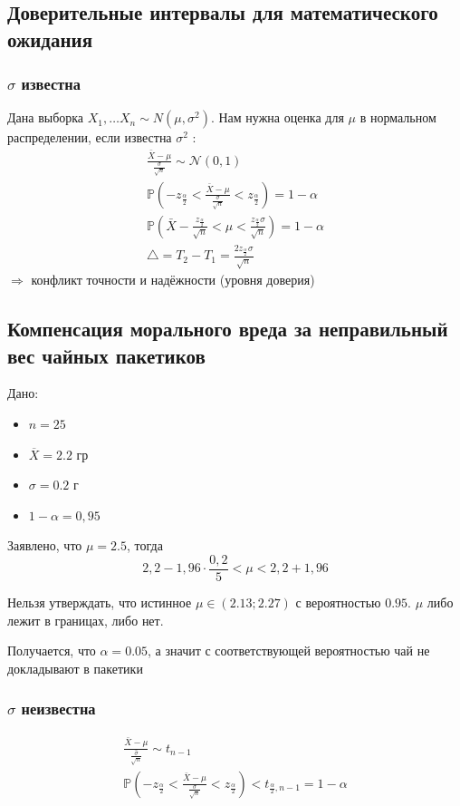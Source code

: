 \documentclass[a4paper, 10pt]{article}
\begin{document}
\subsection{Доверительные интервалы для математического ожидания}
\subsubsection{$\sigma$ известна}
Дана выборка $X_{1}, \ldots X_{n} \sim N\left(\mu, \sigma^{2}\right)$. Нам нужна оценка для $\mu$ в нормальном распределении, если известна $\sigma^{2}$ :
$$
\begin{gathered}
\frac{\bar{X}-\mu}{\frac{\sigma}{\sqrt{n}}} \sim \mathcal{N}(0,1) \\
\mathbb{P}\left(-z_{\frac{\alpha}{2}}<\frac{\bar{X}-\mu}{\frac{\sigma}{\sqrt{n}}}<z_{\frac{\alpha}{2}}\right)=1-\alpha \\
\mathbb{P}\left(\bar{X}-\frac{z_{\frac{\alpha}{2}}}{\sqrt{n}}<\mu<\frac{z_{\frac{\alpha}{2}} \sigma}{\sqrt{n}}\right)=1-\alpha \\
\triangle=T_{2}-T_{1}=\frac{2 z_{\frac{\alpha}{2}} \sigma}{\sqrt{n}}
\end{gathered}
$$
$\Longrightarrow$ конфликт точности и надёжности (уровня доверия)

\subsection{Компенсация морального вреда за неправильный вес чайных пакетиков}
Дано:
\begin{itemize}
    \item $n=25$
    \item $\overline{X}=2.2$ гр
    \item $\sigma=0.2$ г
    \item $1-\alpha=0,95$
\end{itemize}

Заявлено, что $\mu=2.5$, тогда
\begin{equation*}
    2,2-1,96 \cdot \frac{0,2}{5}<\mu<2,2+1,96
\end{equation*}

\comment Нельзя утверждать, что истинное $\mu\in(2.13;2.27)$ с вероятностью $0.95$. $\mu$ либо лежит в границах, либо нет.

Получается, что $\alpha=0.05$, а значит с соответствующей вероятностью чай не докладывают в пакетики

\subsubsection{$\sigma$ неизвестна}
\begin{equation*}
    \begin{gathered}
        \frac{\bar{X}-\mu}{\frac{\hat{\sigma}}{\sqrt{n}}} \sim t_{n-1} \\
        \mathbb{P}\left(-z_{\frac{\alpha}{2}}<\frac{\bar{X}-\mu}{\frac{\sigma}{\sqrt{n}}}<z_{\frac{\alpha}{2}}\right)<t_{\frac{\alpha}{2}, n-1}=1-\alpha
        \end{gathered}
\end{equation*}
\end{document}
